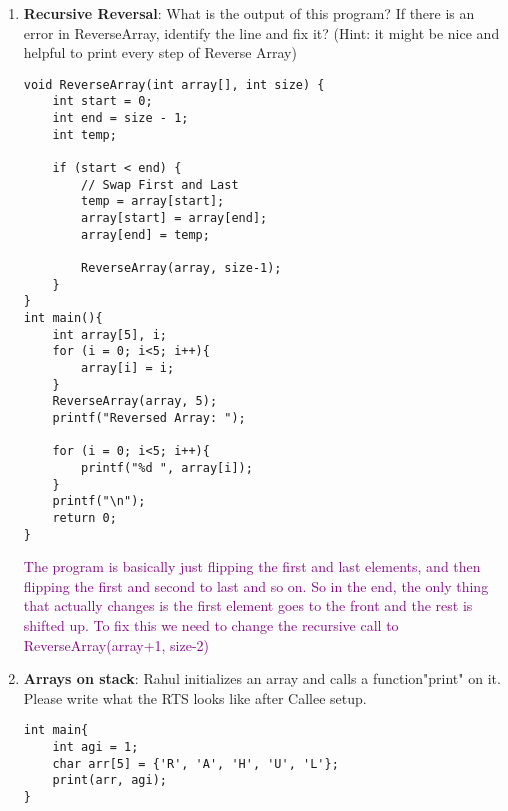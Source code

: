 \documentclass{article}
\begin{document}
\begin{enumerate}[label=(\alph*)]
    
\begin{lstlisting}[style=CStyle] 
find@\wideunderscore@midpoint(int a, int b) {
    if (a == b) { return a; }
    else { return find_midpoint(a+1, b-1); }
}\end{lstlisting}
\textcolor{purple}{There are two main things wrong. The first, is that were is no return type for this function, we need to make this return a float. The second, is that we need to deal with numbers that are odd-length apart, for example 4 and 7. To do this we can add: else if (a+1 == b) {return ((a+b)/2);} as another condition to check. }
    \newpage
    \item \textbf{Recursive Reversal}: What is the output of this program? If there is an error in ReverseArray, identify the line and fix it? (Hint: it might be nice and helpful to print every step of Reverse Array)
    
\begin{lstlisting}[style=CStyle] 
void ReverseArray(int array[], int size) {
    int start = 0;
    int end = size - 1;
    int temp;
    
    if (start < end) {
        // Swap First and Last
        temp = array[start];
        array[start] = array[end];
        array[end] = temp;
        
        ReverseArray(array, size-1);
    }
}
int main(){
    int array[5], i;
    for (i = 0; i<5; i++){
        array[i] = i;
    }
    ReverseArray(array, 5);
    printf("Reversed Array: ");

    for (i = 0; i<5; i++){
        printf("%d ", array[i]);
    }
    printf("\n");
    return 0;
}\end{lstlisting}
\textcolor{purple}{The program is basically just flipping the first and last elements, and then flipping the first and second to last and so on. So in the end, the only thing that actually changes is the first element goes to the front and the rest is shifted up. To fix this we need to change the recursive call to ReverseArray(array+1, size-2)}

\item \textbf{Arrays on stack}: Rahul initializes an array and calls a function"print" on it. Please write what the RTS looks like after Callee setup.
\begin{lstlisting}[style=CStyle] 
int main{
    int agi = 1;
    char arr[5] = {'R', 'A', 'H', 'U', 'L'};
    print(arr, agi);
}
\end{lstlisting}
    \begin{center}


\end{center}
\end{enumerate}
\end{document}
